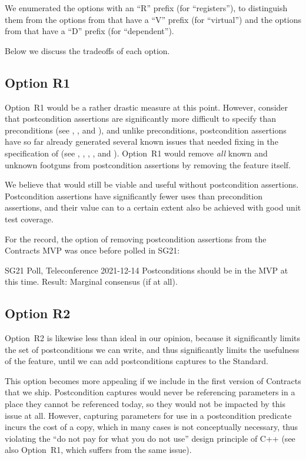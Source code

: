 We enumerated the options with an ``R'' prefix (for ``registers''), to distinguish them from the options from \cite{D3484R1} that have a ``V'' prefix (for ``virtual'') and the options from \cite{D3489R0} that have a ``D'' prefix (for ``dependent'').

Below we discuss the tradeoffs of each option.

\subsection*{Option R1}

Option~R1 would be a rather drastic measure at this point. However, consider that postcondition assertions are significantly more difficult to specify than preconditions (see \cite{P1323R2}, \cite{P3007R0}, and \cite{P3098R0}), and unlike preconditions, postcondition assertions have so far already generated several known issues that needed fixing in the specification of \cite{P2900R10} (see \cite{P3387R0}, \cite{P3460R0}, \cite{P3483R0}, \cite{D3484R1}, and \cite{D3489R0}). Option~R1 would remove \emph{all} known and unknown footguns from postcondition assertions by removing the feature itself.

We believe that \cite{P2900R10} would still be viable and useful without postcondition assertions. Postcondition assertions have significantly fewer uses than precondition assertions, and their value can to a certain extent also be achieved with good unit test coverage. 

For the record, the option of removing postcondition assertions from the Contracts MVP was once before polled in SG21:

\begin{wgpoll}{SG21 Poll, Teleconference 2021-12-14}
Postconditions should be in the MVP at this time.
Result: Marginal consensus (if at all).
\end{wgpoll}

\subsection*{Option R2}

Option~R2 is likewise less than ideal in our opinion, because it significantly limits the set of postconditions we can write, and thus significantly limits the usefulness of the feature, until we can add postconditions captures \cite{P3098R0} to the Standard.

This option becomes more appealing if we include \cite{P3098R0} in the first version of Contracts that we ship. Postcondition captures would never be referencing parameters in a place they cannot be referenced today, so they would not be impacted by this issue at all. However, capturing parameters for use in a postcondition predicate incurs the cost of a copy, which in many cases is not conceptually necessary, thus violating the ``do not pay for what you do not use'' design principle of C++ (see also \cite{D3484R1} Option~R1, which suffers from the same issue).


